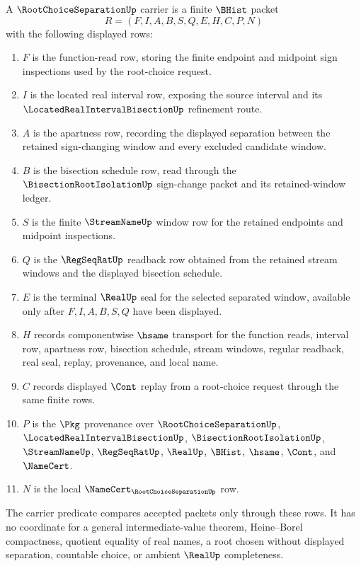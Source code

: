 \begin{definition}
\label{def:root-choice-separation-carrier}
A $\RootChoiceSeparationUp$ carrier is a finite $\BHist$ packet
$$
R=(F,I,A,B,S,Q,E,H,C,P,N)
$$
with the following displayed rows:
\begin{enumerate}
\item $F$ is the function-read row, storing the finite endpoint and midpoint sign inspections used by the root-choice request.
\item $I$ is the located real interval row, exposing the source interval and its $\LocatedRealIntervalBisectionUp$ refinement route.
\item $A$ is the apartness row, recording the displayed separation between the retained sign-changing window and every excluded candidate window.
\item $B$ is the bisection schedule row, read through the $\BisectionRootIsolationUp$ sign-change packet and its retained-window ledger.
\item $S$ is the finite $\StreamNameUp$ window row for the retained endpoints and midpoint inspections.
\item $Q$ is the $\RegSeqRatUp$ readback row obtained from the retained stream windows and the displayed bisection schedule.
\item $E$ is the terminal $\RealUp$ seal for the selected separated window, available only after $F,I,A,B,S,Q$ have been displayed.
\item $H$ records componentwise $\hsame$ transport for the function reads, interval row, apartness row, bisection schedule, stream windows, regular readback, real seal, replay, provenance, and local name.
\item $C$ records displayed $\Cont$ replay from a root-choice request through the same finite rows.
\item $P$ is the $\Pkg$ provenance over $\RootChoiceSeparationUp$, $\LocatedRealIntervalBisectionUp$, $\BisectionRootIsolationUp$, $\StreamNameUp$, $\RegSeqRatUp$, $\RealUp$, $\BHist$, $\hsame$, $\Cont$, and $\NameCert$.
\item $N$ is the local $\NameCert_{\RootChoiceSeparationUp}$ row.
\end{enumerate}
The carrier predicate compares accepted packets only through these rows. It has no coordinate for a general intermediate-value theorem, Heine--Borel compactness, quotient equality of real names, a root chosen without displayed separation, countable choice, or ambient $\RealUp$ completeness.
\end{definition}

